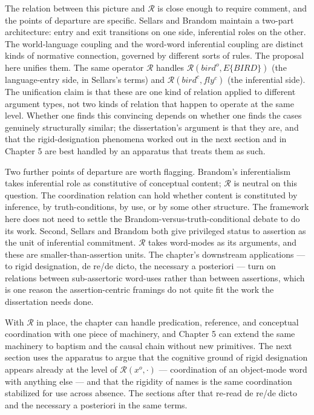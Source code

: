 \documentclass[10pt]{article}
\begin{document}
The relation between this picture and \(\mathcal{R}\) is close enough to require comment, and the points of departure are specific. Sellars and Brandom maintain a two-part architecture: entry and exit transitions on one side, inferential roles on the other. The world-language coupling and the word-word inferential coupling are distinct kinds of normative connection, governed by different sorts of rules. The proposal here unifies them. The same operator \(\mathcal{R}\) handles \(\mathcal{R}(bird^o, E\{BIRD\})\) (the language-entry side, in Sellars's terms) and \(\mathcal{R}(bird^c, fly^c)\) (the inferential side). The unification claim is that these are one kind of relation applied to different argument types, not two kinds of relation that happen to operate at the same level. Whether one finds this convincing depends on whether one finds the cases genuinely structurally similar; the dissertation's argument is that they are, and that the rigid-designation phenomena worked out in the next section and in Chapter 5 are best handled by an apparatus that treats them as such.

Two further points of departure are worth flagging. Brandom's inferentialism takes inferential role as constitutive of conceptual content; \(\mathcal{R}\) is neutral on this question. The coordination relation can hold whether content is constituted by inference, by truth-conditions, by use, or by some other structure. The framework here does not need to settle the Brandom-versus-truth-conditional debate to do its work. Second, Sellars and Brandom both give privileged status to assertion as the unit of inferential commitment. \(\mathcal{R}\) takes word-modes as its arguments, and these are smaller-than-assertion units. The chapter's downstream applications --- to rigid designation, de re/de dicto, the necessary a posteriori --- turn on relations between sub-assertoric word-uses rather than between assertions, which is one reason the assertion-centric framings do not quite fit the work the dissertation needs done.

With \(\mathcal{R}\) in place, the chapter can handle predication, reference, and conceptual coordination with one piece of machinery, and Chapter 5 can extend the same machinery to baptism and the causal chain without new primitives. The next section uses the apparatus to argue that the cognitive ground of rigid designation appears already at the level of \(\mathcal{R}(x^o, \cdot)\) --- coordination of an object-mode word with anything else --- and that the rigidity of names is the same coordination stabilized for use across absence. The sections after that re-read de re/de dicto and the necessary a posteriori in the same terms.
\end{document}
